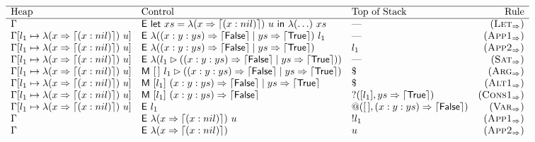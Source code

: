 \begin{figure*}
\[
  \begin{array}{lllr}
    \hline
    \text{Heap}                             & \text{Control}                                             & \text{Top of Stack}                        & \text{Rule}            \\
    \hline
    \Gamma                                  & \eval{\llet{xs = \app{\singlePMC}{u}}{\app{\lambda(\ldots)}{xs}}} & \text{---}                                 & (\smallrule{Let})      \\
    \Gamma[l_1 \mapsto \app{\singlePMC}{u}]
                                            & \eval{\app{\lambda(\isShortBody)}{l_1}}                                 & \text{---}                                 & (\smallrule{App1})     \\
    \Gamma[l_1 \mapsto \app{\singlePMC}{u}] & \eval{\lambda(\isShortBody)}                                            & l_1                                        & (\smallrule{App2})     \\
    \Gamma[l_1 \mapsto \app{\singlePMC}{u}] & \eval{\abstr{(\matcharg{l_1}{(\isShortBody)})}}              & \text{---}                                 & (\smallrule{Sat})      \\
    \Gamma[l_1 \mapsto \app{\singlePMC}{u}] & \match{[\,]}{\matcharg{l_1}{(\isShortBody)}}                 & \$                                         & (\smallrule{Arg})      \\
    \Gamma[l_1 \mapsto \app{\singlePMC}{u}] & \match{[l_1]}{\isShortBody}                                & \$                                         & (\smallrule{Alt1})     \\
    \Gamma[l_1 \mapsto \app{\singlePMC}{u}] & \match{[l_1]}{\matchpat{(x : y : ys)}{\retFalse}}          & ?([l_1],\matchpat{ys}{\retTrue})           & (\smallrule{Cons1})    \\
    \Gamma[l_1 \mapsto \app{\singlePMC}{u}] & \eval{l_1}                                                 & @([\,],\matchpat{(x : y : ys)}{\retFalse}) & (\smallrule{Var})      \\
    \Gamma                                  & \eval{\app{\singlePMC}{u}}                                 & !l_1                                       & (\smallrule{App1})     \\
    \Gamma                                  & \eval{\singlePMC}                                          & u                                          & (\smallrule{App2})     \\

\end{array}\]
\end{figure*}
